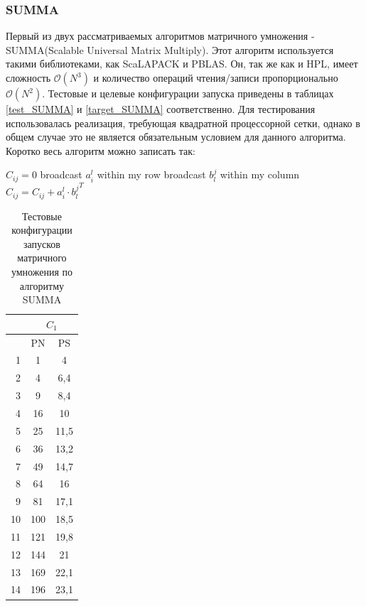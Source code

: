 		\subsubsection{SUMMA}
			Первый из двух рассматриваемых алгоритмов матричного умножения - SUMMA(Scalable Universal Matrix Multiply)\cite{SUMMA}. Этот алгоритм используется такими библиотеками, как ScaLAPACK и PBLAS. Он, так же как и HPL, имеет сложность \(\mathcal{O}(N^3)\) и количество операций чтения/записи пропорционально \(\mathcal{O}(N^2)\). Тестовые и целевые конфигурации запуска приведены в таблицах \eqref{test_SUMMA} и \eqref{target_SUMMA} соответственно. Для тестирования использовалась реализация, требующая квадратной процессорной сетки, однако в общем случае это не является обязательным условием для данного алгоритма. Коротко весь алгоритм можно записать так:
			\begin{algorithm}
				\begin{algorithmic}
					\State $C_{ij} = 0$
					\State broadcast $a_i^l$ within my row
					\State broadcast $b_l^j$ within my column
					\State $C_{ij} = C_{ij} + a_i^l \cdot {b_l^j}^T$
					\EndFor
				\label{SUMMA_algo}
				\end{algorithmic}
			\end{algorithm}

			\begin{table}
				\centering
				\begin{tabular}{|r|c|c|}
					\hline
					            & \multicolumn{2}{c|}{\(C_1\)} \\ \hline
					\textnumero & PN  & PS                     \\ \hline
					1           & 1   & 4                      \\ \hline
					2           & 4   & 6,4                    \\ \hline
					3           & 9   & 8,4                    \\ \hline
					4           & 16  & 10                     \\ \hline
					5           & 25  & 11,5                   \\ \hline
					6           & 36  & 13,2                   \\ \hline
					7           & 49  & 14,7                   \\ \hline
					8           & 64  & 16                     \\ \hline
					9           & 81  & 17,1                   \\ \hline
					10          & 100 & 18,5                   \\ \hline
					11          & 121 & 19,8                   \\ \hline
					12          & 144 & 21                     \\ \hline
					13          & 169 & 22,1                   \\ \hline
					14          & 196 & 23,1                   \\ \hline
				\end{tabular}
				\caption{Тестовые конфигурации запусков матричного умножения по алгоритму SUMMA}
				\label{test_SUMMA}
			\end{table}

